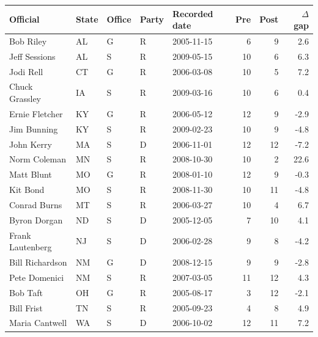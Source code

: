 \begin{tabular}{lllllrrr}
\toprule
Official & State & Office & Party & Recorded date & Pre & Post & $\Delta$ gap \\
\midrule
Bob Riley & AL & G & R & 2005-11-15 & 6 & 9 & 2.6 \\
Jeff Sessions & AL & S & R & 2009-05-15 & 10 & 6 & 6.3 \\
Jodi Rell & CT & G & R & 2006-03-08 & 10 & 5 & 7.2 \\
Chuck Grassley & IA & S & R & 2009-03-16 & 10 & 6 & 0.4 \\
Ernie Fletcher & KY & G & R & 2006-05-12 & 12 & 9 & -2.9 \\
Jim Bunning & KY & S & R & 2009-02-23 & 10 & 9 & -4.8 \\
John Kerry & MA & S & D & 2006-11-01 & 12 & 12 & -7.2 \\
Norm Coleman & MN & S & R & 2008-10-30 & 10 & 2 & 22.6 \\
Matt Blunt & MO & G & R & 2008-01-10 & 12 & 9 & -0.3 \\
Kit Bond & MO & S & R & 2008-11-30 & 10 & 11 & -4.8 \\
Conrad Burns & MT & S & R & 2006-03-27 & 10 & 4 & 6.7 \\
Byron Dorgan & ND & S & D & 2005-12-05 & 7 & 10 & 4.1 \\
Frank Lautenberg & NJ & S & D & 2006-02-28 & 9 & 8 & -4.2 \\
Bill Richardson & NM & G & D & 2008-12-15 & 9 & 9 & -2.8 \\
Pete Domenici & NM & S & R & 2007-03-05 & 11 & 12 & 4.3 \\
Bob Taft & OH & G & R & 2005-08-17 & 3 & 12 & -2.1 \\
Bill Frist & TN & S & R & 2005-09-23 & 4 & 8 & 4.9 \\
Maria Cantwell & WA & S & D & 2006-10-02 & 12 & 11 & 7.2 \\
\bottomrule
\end{tabular}
